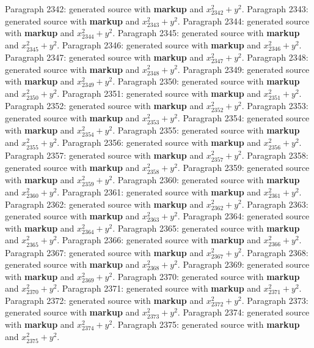 \documentclass{article}
\begin{document}
Paragraph 2342: generated source with \textbf{markup} and $x_{2342}^2 + y^2$.
Paragraph 2343: generated source with \textbf{markup} and $x_{2343}^2 + y^2$.
Paragraph 2344: generated source with \textbf{markup} and $x_{2344}^2 + y^2$.
Paragraph 2345: generated source with \textbf{markup} and $x_{2345}^2 + y^2$.
Paragraph 2346: generated source with \textbf{markup} and $x_{2346}^2 + y^2$.
Paragraph 2347: generated source with \textbf{markup} and $x_{2347}^2 + y^2$.
Paragraph 2348: generated source with \textbf{markup} and $x_{2348}^2 + y^2$.
Paragraph 2349: generated source with \textbf{markup} and $x_{2349}^2 + y^2$.
Paragraph 2350: generated source with \textbf{markup} and $x_{2350}^2 + y^2$.
Paragraph 2351: generated source with \textbf{markup} and $x_{2351}^2 + y^2$.
Paragraph 2352: generated source with \textbf{markup} and $x_{2352}^2 + y^2$.
Paragraph 2353: generated source with \textbf{markup} and $x_{2353}^2 + y^2$.
Paragraph 2354: generated source with \textbf{markup} and $x_{2354}^2 + y^2$.
Paragraph 2355: generated source with \textbf{markup} and $x_{2355}^2 + y^2$.
Paragraph 2356: generated source with \textbf{markup} and $x_{2356}^2 + y^2$.
Paragraph 2357: generated source with \textbf{markup} and $x_{2357}^2 + y^2$.
Paragraph 2358: generated source with \textbf{markup} and $x_{2358}^2 + y^2$.
Paragraph 2359: generated source with \textbf{markup} and $x_{2359}^2 + y^2$.
Paragraph 2360: generated source with \textbf{markup} and $x_{2360}^2 + y^2$.
Paragraph 2361: generated source with \textbf{markup} and $x_{2361}^2 + y^2$.
Paragraph 2362: generated source with \textbf{markup} and $x_{2362}^2 + y^2$.
Paragraph 2363: generated source with \textbf{markup} and $x_{2363}^2 + y^2$.
Paragraph 2364: generated source with \textbf{markup} and $x_{2364}^2 + y^2$.
Paragraph 2365: generated source with \textbf{markup} and $x_{2365}^2 + y^2$.
Paragraph 2366: generated source with \textbf{markup} and $x_{2366}^2 + y^2$.
Paragraph 2367: generated source with \textbf{markup} and $x_{2367}^2 + y^2$.
Paragraph 2368: generated source with \textbf{markup} and $x_{2368}^2 + y^2$.
Paragraph 2369: generated source with \textbf{markup} and $x_{2369}^2 + y^2$.
Paragraph 2370: generated source with \textbf{markup} and $x_{2370}^2 + y^2$.
Paragraph 2371: generated source with \textbf{markup} and $x_{2371}^2 + y^2$.
Paragraph 2372: generated source with \textbf{markup} and $x_{2372}^2 + y^2$.
Paragraph 2373: generated source with \textbf{markup} and $x_{2373}^2 + y^2$.
Paragraph 2374: generated source with \textbf{markup} and $x_{2374}^2 + y^2$.
Paragraph 2375: generated source with \textbf{markup} and $x_{2375}^2 + y^2$.
\end{document}
